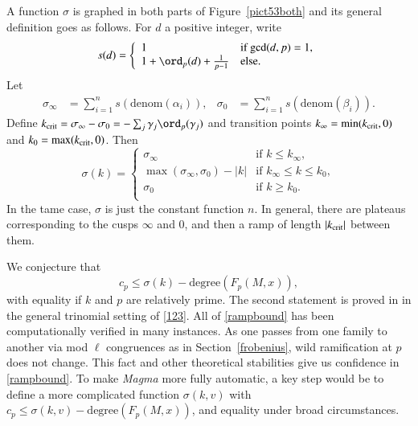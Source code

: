 \documentclass{notices}
\numberwithin{equation}{section}
\numberwithin{table}{section}
\numberwithin{figure}{section}
\begin{document}
{A function $\sigma$ is graphed in both parts of Figure~\ref{pict53both} 
and its general definition goes as follows.  
For $d$ a positive integer, write
\[
s(d) =
\left\{
\begin{array}{ll}
1 & \mbox{if $\gcd(d,p)=1$,} \\
1+\ord_p(d) + \frac{1}{p-1}  & \mbox{else.}
\end{array}
\right.
\]
Let
\begin{align*}
\sigma_\infty & = \sum_{i=1}^n s(\mbox{denom}(\alpha_i)), &
\sigma_0 & = \sum_{i=1}^n s(\mbox{denom}(\beta_i)). 
\end{align*}
Define $k_{\rm crit} = \sigma_\infty-\sigma_0 = -\sum_j \gamma_j \ord_p(\gamma_j)$ 
and transition points $k_\infty = \min(k_{\rm crit},0)$ 
and $k_0 = \max(k_{\rm crit},0)$.  Then 
\[
\sigma(k) = 
\left\{
\begin{array}{ll}
\sigma_\infty & \mbox{if $k \leq k_\infty$},\\
\max(\sigma_\infty,\sigma_0)-|k|& \mbox{if $k_\infty \leq k \leq k_0$}, \\
\sigma_0 & \mbox{if $k \geq k_0$}. \\
\end{array}
\right.
\]
In the tame case, 
$\sigma$ is just the constant function $n$. 
In general, there are plateaus corresponding
to the cusps $\infty$ and $0$, and then
a ramp of length $|k_{\rm crit}|$ between them.  

We conjecture that 
\begin{equation}
\label{rampbound}
c_p \leq \sigma(k)-\mbox{degree}(F_p(M,x)),
\end{equation}
with equality if
$k$ and $p$ are relatively prime.   
The second statement is proved in \cite{LNV}
in the general trinomial setting of 
\eqref{123}.  All of \eqref{rampbound}
has been computationally verified 
in many instances.  As one passes from 
one family to another via mod $\ell$
congruences as in Section~\ref{frobenius}, wild ramification
at $p$ does not change.  This fact and other
theoretical stabilities give us confidence in 
\eqref{rampbound}.   To make
{\em Magma} more fully automatic, a key step
would be to define a more 
 complicated
function $\sigma(k,v)$ with
$c_p \leq \sigma(k,v)-\mbox{degree}(F_p(M,x))$, and equality
under broad circumstances. 

}
\end{document}
